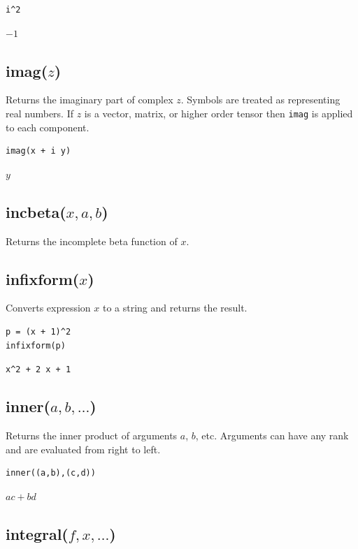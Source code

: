 {\color{blue}
\begin{verbatim}
i^2
\end{verbatim}
}

$-1$

\subsection*{imag($z$)}

Returns the imaginary part of complex $z$.
Symbols are treated as representing real numbers.
If $z$ is a vector, matrix, or higher order tensor then
\verb$imag$ is applied to each component.

{\color{blue}
\begin{verbatim}
imag(x + i y)
\end{verbatim}
}

$y$

\subsection*{incbeta($x,a,b$)}

Returns the incomplete beta function of $x$.

\subsection*{infixform($x$)}

Converts expression $x$ to a string and returns the result.

{\color{blue}
\begin{verbatim}
p = (x + 1)^2
infixform(p)
\end{verbatim}
}

\verb$x^2 + 2 x + 1$

\subsection*{inner($a,b,\ldots$)}

Returns the inner product of arguments $a$, $b$, etc.
Arguments can have any rank and are evaluated from right to left.

{\color{blue}
\begin{verbatim}
inner((a,b),(c,d))
\end{verbatim}
}

$ac+bd$

\subsection*{integral($f,x,\ldots$)}

